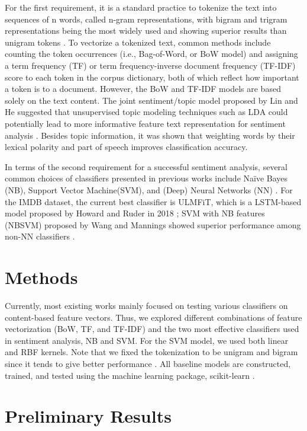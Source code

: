\documentclass{article}
\begin{document}
For the first requirement, it is a standard practice to tokenize the text into sequences of n words, called n-gram representations, with bigram and trigram representations being the most widely used and showing superior results than unigram tokens \cite{Wang}. To vectorize a tokenized text, common methods include counting the token occurrences (i.e., Bag-of-Word, or BoW model) and assigning a term frequency (TF) or term frequency-inverse document frequency (TF-IDF) score to each token in the corpus dictionary, both of which reflect how important a token is to a document. However, the BoW and TF-IDF models are based solely on the text content. The joint sentiment/topic model proposed by Lin and He suggested that unsupervised topic modeling techniques such as LDA could potentially lead to more informative feature text representation for sentiment analysis \cite{Lin}. Besides topic information, it was shown that weighting words by their lexical polarity and part of speech improves classification accuracy. 


In terms of the second requirement for a successful sentiment analysis, several common choices of classifiers presented in previous works include Na{\"i}ve Bayes (NB), Support Vector Machine(SVM), and (Deep) Neural Networks (NN) \cite{Howard, Wang} . For the IMDB dataset, the current best classifier is ULMFiT, which is a LSTM-based model proposed by Howard and Ruder in 2018 \cite{Howard}; SVM with NB features (NBSVM) proposed by Wang and Mannings showed superior performance among non-NN classifiers \cite{Wang}.


\section{Methods}

Currently, most existing works mainly focused on testing various classifiers on content-based feature vectors. Thus, we explored different combinations of feature vectorization (BoW, TF, and TF-IDF) and the two most effective classifiers used in sentiment analysis, NB and SVM. For the SVM model, we used both linear and RBF kernels. Note that we fixed the tokenization to be unigram and bigram since it tends to give better performance \cite{Pang}. All baseline models are constructed, trained, and tested using the machine learning package, scikit-learn \cite{Pedregosa}.




\section{Preliminary Results}
\end{document}
